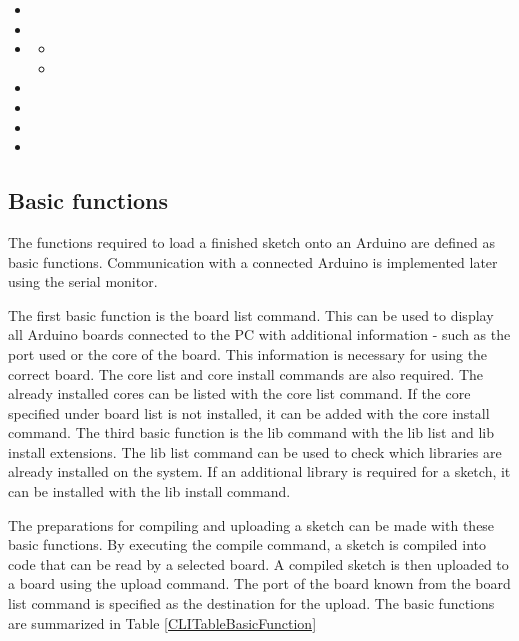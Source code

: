 \begin{itemize}
\begin{itemize}
		\item {}
		\item {}
		\item {}
		\item {}
		\item {}
		\item {}
	\end{itemize}
	\item {}
	\item {}
	\item {}
	\begin{itemize}
		\item {}
		\item {}
	\end{itemize}
	\item {}
	\item {}
	\item {}
	\item {}
\end{itemize}

\subsection{Basic functions}

The functions required to load a finished sketch onto an Arduino are defined as basic functions. Communication with a connected Arduino is implemented later using the serial monitor.

\bigskip
The first basic function is the board list command. This can be used to display all Arduino boards connected to the PC with additional information - such as the port used or the core of the board. This information is necessary for using the correct board.
The core list and core install commands are also required. The already installed cores can be listed with the core list command. If the core specified under board list is not installed, it can be added with the core install command.
The third basic function is the lib command with the lib list and lib install extensions. The lib list command can be used to check which libraries are already installed on the system. If an additional library is required for a sketch, it can be installed with the lib install command.

The preparations for compiling and uploading a sketch can be made with these basic functions. By executing the compile command, a sketch is compiled into code that can be read by a selected board. A compiled sketch is then uploaded to a board using the upload command. The port of the board known from the board list command is specified as the destination for the upload. The basic functions are summarized  in Table \ref{CLITableBasicFunction}

